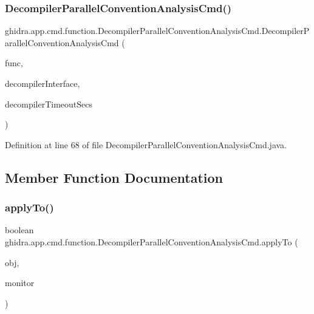 \subsubsection{\texorpdfstring{DecompilerParallelConventionAnalysisCmd()}{DecompilerParallelConventionAnalysisCmd()}}
{\footnotesize\ttfamily ghidra.\+app.\+cmd.\+function.\+Decompiler\+Parallel\+Convention\+Analysis\+Cmd.\+Decompiler\+Parallel\+Convention\+Analysis\+Cmd (\begin{DoxyParamCaption}\item[{Function}]{func,  }\item[{\mbox{\hyperlink{classghidra_1_1app_1_1decompiler_1_1_decomp_interface}{Decomp\+Interface}}}]{decompiler\+Interface,  }\item[{int}]{decompiler\+Timeout\+Secs }\end{DoxyParamCaption})\hspace{0.3cm}{\ttfamily [inline]}}



Definition at line 68 of file Decompiler\+Parallel\+Convention\+Analysis\+Cmd.\+java.



\subsection{Member Function Documentation}
\mbox{\label{classghidra_1_1app_1_1cmd_1_1function_1_1_decompiler_parallel_convention_analysis_cmd_a3aba464e1119b814fe01b9b796c8d6c7}} 
\subsubsection{\texorpdfstring{applyTo()}{applyTo()}}
{\footnotesize\ttfamily boolean ghidra.\+app.\+cmd.\+function.\+Decompiler\+Parallel\+Convention\+Analysis\+Cmd.\+apply\+To (\begin{DoxyParamCaption}\item[{Domain\+Object}]{obj,  }\item[{Task\+Monitor}]{monitor }\end{DoxyParamCaption})\hspace{0.3cm}{\ttfamily [inline]}}




